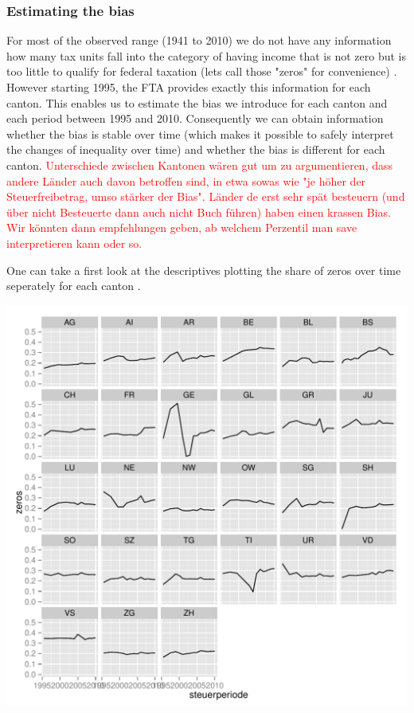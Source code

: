 \documentclass[twoside]{article}\usepackage[]{graphicx}\usepackage[]{color}
\makeatletter
\def\maxwidth{ %
  \ifdim\Gin@nat@width>\linewidth
    \linewidth
  \else
    \Gin@nat@width
  \fi
}
\newenvironment{knitrout}{}{} %
\makeatother
\begin{document}
\begin{multicols}{2}
\subsubsection{Estimating the bias}
For most of the observed range (1941 to 2010) we do not have any information how many tax units fall into the category of having income that is not zero but is too little to qualify for federal taxation (lets call those "zeros" for convenience) . However starting 1995, the FTA provides exactly this information for each canton. This enables us to estimate the bias we introduce for each canton and each period between 1995 and 2010. Consequently we can obtain information whether the bias is stable over time (which makes it possible to safely interpret the changes of inequality over time) and whether the bias is different for each canton. \textcolor{red}{Unterschiede zwischen Kantonen wären gut um zu argumentieren, dass andere Länder auch davon betroffen sind, in etwa sowas wie "je höher der Steuerfreibetrag, umso stärker der Bias". Länder de erst sehr spät besteuern (und über nicht Besteuerte dann auch nicht Buch führen) haben einen krassen Bias. Wir könnten dann empfehlungen geben, ab welchem Perzentil man save interpretieren kann oder so.}

One can take a first look at the descriptives plotting the share of zeros over time seperately for each canton .




\begin{knitrout}
\color{fgcolor}
\includegraphics[width=\maxwidth]{figure/zero_descriptives1} 


\end{knitrout}
\end{multicols}
\end{document}
